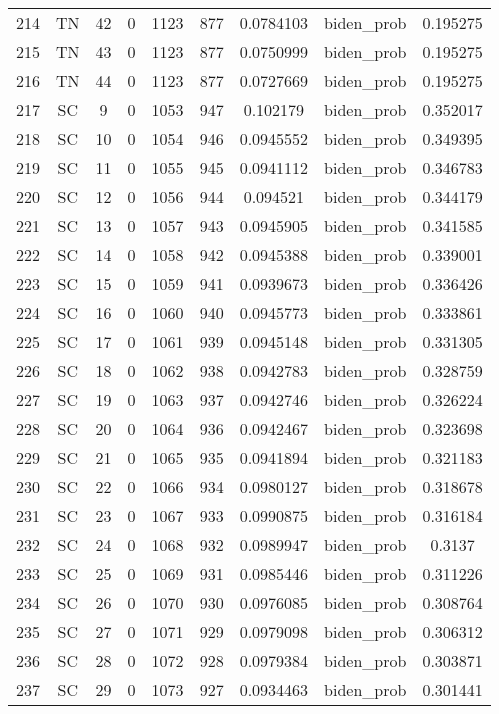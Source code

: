 \documentclass[12pt,a4paper]{article}
\begin{document}
\begin{tabular}{r|cccccccc}
	214 & TN & 42 & 0 & 1123 & 877 & 0.0784103 & biden\_prob & 0.195275 \\
	215 & TN & 43 & 0 & 1123 & 877 & 0.0750999 & biden\_prob & 0.195275 \\
	216 & TN & 44 & 0 & 1123 & 877 & 0.0727669 & biden\_prob & 0.195275 \\
	217 & SC & 9 & 0 & 1053 & 947 & 0.102179 & biden\_prob & 0.352017 \\
	218 & SC & 10 & 0 & 1054 & 946 & 0.0945552 & biden\_prob & 0.349395 \\
	219 & SC & 11 & 0 & 1055 & 945 & 0.0941112 & biden\_prob & 0.346783 \\
	220 & SC & 12 & 0 & 1056 & 944 & 0.094521 & biden\_prob & 0.344179 \\
	221 & SC & 13 & 0 & 1057 & 943 & 0.0945905 & biden\_prob & 0.341585 \\
	222 & SC & 14 & 0 & 1058 & 942 & 0.0945388 & biden\_prob & 0.339001 \\
	223 & SC & 15 & 0 & 1059 & 941 & 0.0939673 & biden\_prob & 0.336426 \\
	224 & SC & 16 & 0 & 1060 & 940 & 0.0945773 & biden\_prob & 0.333861 \\
	225 & SC & 17 & 0 & 1061 & 939 & 0.0945148 & biden\_prob & 0.331305 \\
	226 & SC & 18 & 0 & 1062 & 938 & 0.0942783 & biden\_prob & 0.328759 \\
	227 & SC & 19 & 0 & 1063 & 937 & 0.0942746 & biden\_prob & 0.326224 \\
	228 & SC & 20 & 0 & 1064 & 936 & 0.0942467 & biden\_prob & 0.323698 \\
	229 & SC & 21 & 0 & 1065 & 935 & 0.0941894 & biden\_prob & 0.321183 \\
	230 & SC & 22 & 0 & 1066 & 934 & 0.0980127 & biden\_prob & 0.318678 \\
	231 & SC & 23 & 0 & 1067 & 933 & 0.0990875 & biden\_prob & 0.316184 \\
	232 & SC & 24 & 0 & 1068 & 932 & 0.0989947 & biden\_prob & 0.3137 \\
	233 & SC & 25 & 0 & 1069 & 931 & 0.0985446 & biden\_prob & 0.311226 \\
	234 & SC & 26 & 0 & 1070 & 930 & 0.0976085 & biden\_prob & 0.308764 \\
	235 & SC & 27 & 0 & 1071 & 929 & 0.0979098 & biden\_prob & 0.306312 \\
	236 & SC & 28 & 0 & 1072 & 928 & 0.0979384 & biden\_prob & 0.303871 \\
	237 & SC & 29 & 0 & 1073 & 927 & 0.0934463 & biden\_prob & 0.301441 \\

\end{tabular}
\end{document}
